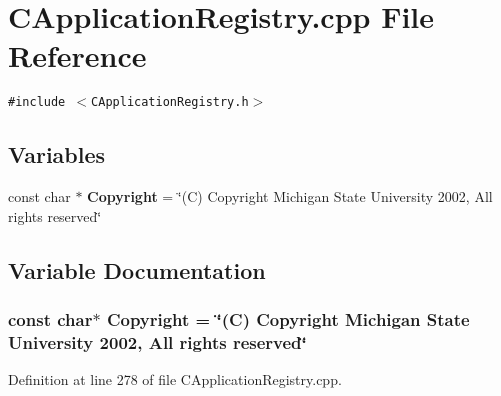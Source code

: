 \section{CApplication\-Registry.cpp File Reference}
\label{CApplicationRegistry_8cpp}
{\tt \#include $<$CApplication\-Registry.h$>$}\par
\subsection*{Variables}
\begin{CompactItemize}
\item 
const char $\ast$ {\bf Copyright} = \char`\"{}(C) Copyright Michigan State University 2002, All rights reserved\char`\"{}
\end{CompactItemize}


\subsection{Variable Documentation}
\subsubsection{\setlength{\rightskip}{0pt plus 5cm}const char$\ast$ Copyright = \char`\"{}(C) Copyright Michigan State University 2002, All rights reserved\char`\"{}\hspace{0.3cm}{\tt  [static]}}\label{CApplicationRegistry_8cpp_a0}




Definition at line 278 of file CApplication\-Registry.cpp.